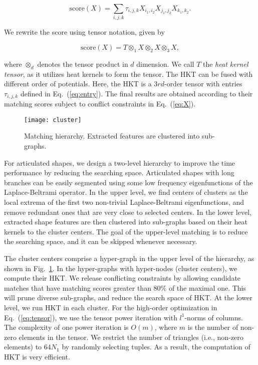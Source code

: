 \begin{equation}
\mbox{score}(X)=\sum_{i,j,k} \tau_{i,j,k} X_{i_{1},i_{2}} X_{j_{1},j_{2}} X_{k_{1},k_{2}}.
\end{equation}

We rewrite the score using tensor notation, given by

\begin{equation}\label{eq:tensor}
\mbox{score}(X)=T\otimes_{1}X\otimes_{2}X\otimes_{3}X,
\end{equation}

where $\otimes_{d}$ denotes the tensor product in $d$ dimension. We call $T$ the \emph{heat kernel tensor}, as it utilizes heat kernels to form the tensor. The HKT can be fused with different order of potentials. Here, the HKT is a $3rd$-order tensor with entries $\tau_{i,j,k}$ defined in Eq.~(\ref{eq:entry}). The final results are obtained according to their matching scores subject to conflict constraints in Eq.~(\ref{eq:X}).

\begin{figure}
\centering
\texttt{[image: cluster]}\\
\caption{Matching hierarchy. Extracted features are clustered into sub-graphs.}
\label{fig:cluster}
\end{figure}

For articulated shapes, we design a two-level hierarchy to improve the time performance by
reducing the searching space. Articulated shapes with long branches can be easily segmented
using some low frequency eigenfunctions of the Laplace-Beltrami operator. In the upper
level, we find centers of clusters as the local extrema of the first two non-trivial
Laplace-Beltrami eigenfunctions, and remove redundant ones that are very close to selected
centers. In the lower level, extracted shape features are then clustered into sub-graphs
based on their heat kernels to the cluster centers. The goal of the upper-level matching
is to reduce the searching space, and it can be skipped whenever necessary.

The cluster centers comprise a hyper-graph in the upper level of the hierarchy, as shown in Fig.~\ref{fig:cluster}. In the hyper-graphs with hyper-nodes (cluster centers), we compute their HKT. We release conflicting constraints by allowing candidate matches that have matching scores greater than $80\%$ of the maximal one. This will prune diverse sub-graphs, and reduce the search space of HKT. At the lower level, we run HKT in each cluster. For the high-order optimization in Eq.~(\ref{eq:tensor}), we use the tensor power iteration with $l^{1}$-norms of columns. The complexity of one power iteration is $O(m)$, where $m$ is the number of non-zero elements in the tensor. We restrict the number of triangles (i.e., non-zero elements) to $64N_1$ by randomly selecting tuples. As a result, the computation of HKT is very efficient.

